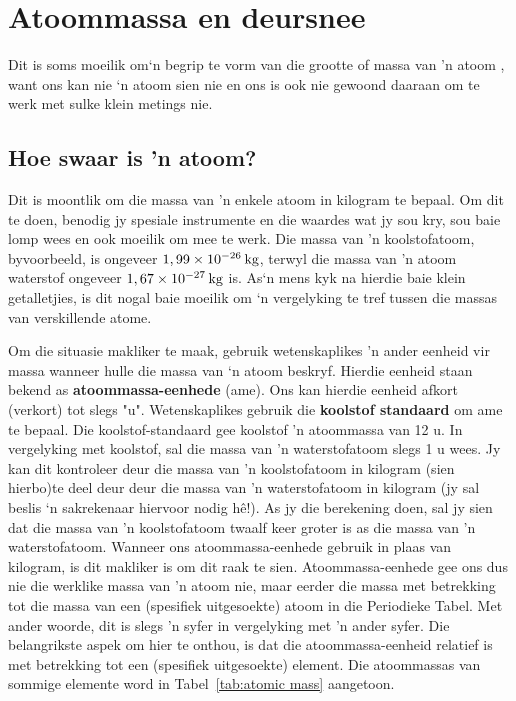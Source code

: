             \section{Atoommassa en deursnee}
            \nopagebreak
            \label{m38756*id254850}Dit is soms moeilik om‘n begrip te vorm van die grootte of massa van 'n atoom , want ons kan nie ‘n atoom sien nie en ons is ook nie gewoond daaraan om te werk met sulke klein metings nie.\par 
      \label{m38756*uid7}
            \subsection*{Hoe swaar is 'n atoom?}
            \nopagebreak
        \label{m38756*id254863}
Dit is moontlik om die massa van 'n enkele atoom in kilogram te bepaal. Om dit te doen, benodig jy spesiale instrumente en die waardes wat jy sou kry, sou baie lomp wees en ook moeilik om mee te werk. Die massa van 'n koolstofatoom, byvoorbeeld, is ongeveer  $1,99\ensuremath{\times}{10}^{-26}\phantom{\rule{2pt}{0ex}}\text{kg}$, terwyl die massa van 'n atoom waterstof ongeveer $1,67\ensuremath{\times}{10}^{-27}\phantom{\rule{2pt}{0ex}}\text{kg}$ is. As‘n mens kyk na hierdie baie klein getalletjies, is dit nogal baie moeilik om ‘n vergelyking te tref tussen die massas van verskillende atome.\par 
        \label{m38756*id254908}
Om die situasie makliker te maak, gebruik wetenskaplikes 'n ander eenheid vir massa wanneer hulle die massa van ‘n atoom beskryf. Hierdie eenheid staan bekend as \textbf{atoommassa-eenhede} (ame). Ons kan hierdie eenheid afkort (verkort) tot slegs "u". Wetenskaplikes gebruik die \textbf{koolstof standaard} om ame te bepaal. Die koolstof-standaard gee koolstof 'n atoommassa van 12 u. In vergelyking met koolstof, sal die massa van 'n waterstofatoom slegs 1 u wees. Jy kan dit kontroleer deur die massa van 'n koolstofatoom in kilogram (sien hierbo)te deel deur deur die massa van 'n waterstofatoom in kilogram (jy sal beslis ‘n sakrekenaar hiervoor nodig hê!). As jy die berekening doen, sal jy sien dat die massa van 'n
koolstofatoom twaalf keer groter is as die massa van 'n waterstofatoom. Wanneer ons atoommassa-eenhede gebruik in plaas van kilogram, is dit makliker is om dit raak te sien. Atoommassa-eenhede gee ons dus nie die werklike massa van 'n atoom nie, maar eerder die massa met betrekking tot die massa van een (spesifiek uitgesoekte) atoom in die Periodieke Tabel. Met ander woorde, dit is slegs 'n syfer in vergelyking met 'n ander syfer. Die belangrikste aspek om hier te onthou, is dat die atoommassa-eenheid relatief is met betrekking tot een (spesifiek uitgesoekte) element. Die atoommassas van sommige elemente word in Tabel~\ref{tab:atomic mass} aangetoon.
